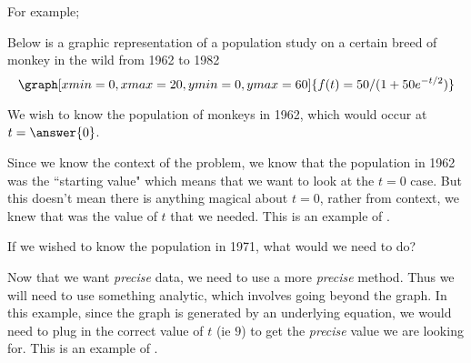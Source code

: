 \documentclass{ximera}
\begin{document}
    For example;
    \begin{example}
        Below is a graphic representation of a population study on a certain breed of monkey in the wild from 1962 to 1982\\
        \[
            \graph[xmin=0,xmax=20,ymin=0,ymax=60]{f(t)=50/(1+50e^{-t/2})}
        \]
        
        We wish to know the population of monkeys in 1962, which would occur at $t = \answer{0}$.
        \begin{explanation}
            Since we know the context of the problem, we know that the population in 1962 was the ``starting value" which means that we want to look at the $t = 0$ case. But this doesn't mean there is anything magical about $t=0$, rather from context, we knew that was the value of $t$ that we needed. This is an example of .
        \end{explanation}
    
        \begin{problem}
            If we wished to know the population in 1971, what would we need to do?
            
            \begin{multipleChoice}
            \end{multipleChoice}

            \begin{explanation}
                Now that we want \textit{precise} data, we need to use a more \textit{precise} method. Thus we will need to use something analytic, which involves going beyond the graph. In this example, since the graph is generated by an underlying equation, we would need to plug in the correct value of $t$ (ie $9$) to get the \textit{precise} value we are looking for. This is an example of .
            \end{explanation}            
            
        \end{problem}
        
    \end{example}
    
    
\end{document}
